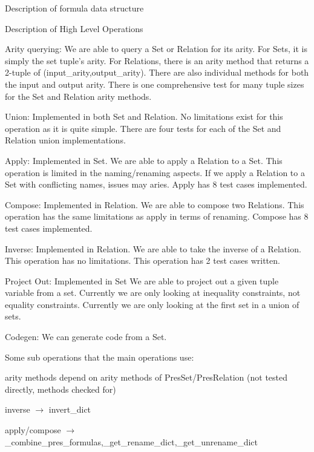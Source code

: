 \documentclass{book}
\begin{document}
\begin{section}{Description of formula data structure}
\end{section}

\begin{section}{Description of High Level Operations}

Arity querying: We are able to query a Set or Relation for its arity.
For Sets, it is simply the set tuple's arity.
For Relations, there is an arity method that returns a 2-tuple of (input\_arity,output\_arity).
There are also individual methods for both the input and output arity.
There is one comprehensive test for many tuple sizes for the Set and Relation arity methods.

Union: Implemented in both Set and Relation.
No limitations exist for this operation as it is quite simple.
There are four tests for each of the Set and Relation union implementations.

Apply: Implemented in Set.
We are able to apply a Relation to a Set.
This operation is limited in the naming/renaming aspects.
If we apply a Relation to a Set with conflicting names, issues may aries.
Apply has 8 test cases implemented.

Compose: Implemented in Relation.
We are able to compose two Relations.
This operation has the same limitations as apply in terms of renaming.
Compose has 8 test cases implemented.

Inverse: Implemented in Relation.
We are able to take the inverse of a Relation.
This operation has no limitations.
This operation has 2 test cases written.

Project Out: Implemented in Set
We are able to project out a given tuple variable from a set.
Currently we are only looking at inequality constraints, not equality constraints.
Currently we are only looking at the first set in a union of sets.

Codegen: We can generate code from a Set.

Some sub operations that the main operations use:

arity methods depend on arity methods of PresSet/PresRelation (not tested directly, methods checked for)

inverse $\rightarrow$ invert\_dict

apply/compose $\rightarrow$ \_combine\_pres\_formulas,\_get\_rename\_dict,\_get\_unrename\_dict

\end{section}
\end{document}

